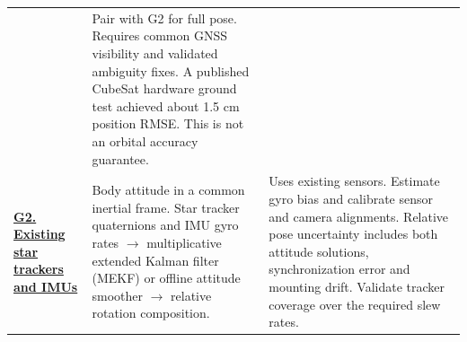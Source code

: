 \documentclass[10pt,a4paper,landscape]{article}
\begin{document}
\begin{table}[!ht]
\begin{tabularx}{\linewidth}{@{}>{\RaggedRight\arraybackslash}p{44mm}YY@{}}
& Pair with G2 for full pose. Requires common GNSS visibility and validated ambiguity fixes. A published CubeSat hardware ground test achieved about 1.5 cm position RMSE. This is not an orbital accuracy guarantee. \\
\addlinespace[3pt]
\href{https://www.aac-clyde.space/wp-content/uploads/2021/11/ST200-1.pdf}{\textbf{G2. Existing star trackers and IMUs}}
& Body attitude in a common inertial frame. Star tracker quaternions and IMU gyro rates $\rightarrow$ multiplicative extended Kalman filter (MEKF) or offline attitude smoother $\rightarrow$ relative rotation composition.
& Uses existing sensors. Estimate gyro bias and calibrate sensor and camera alignments. Relative pose uncertainty includes both attitude solutions, synchronization error and mounting drift. Validate tracker coverage over the required slew rates. \\
\bottomrule
\end{tabularx}
\end{table}
\end{document}
